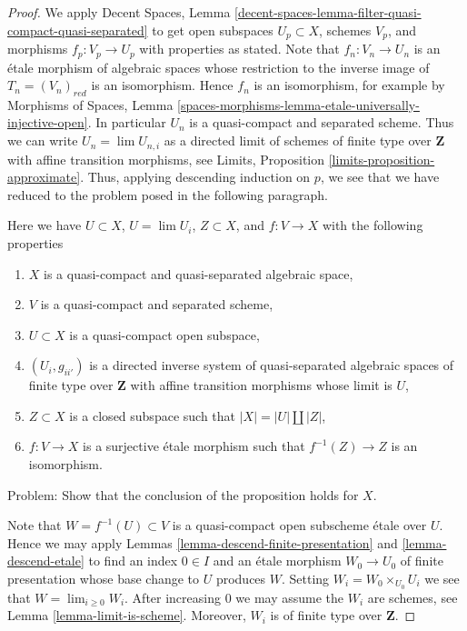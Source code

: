\begin{proof}
We apply Decent Spaces, Lemma
\ref{decent-spaces-lemma-filter-quasi-compact-quasi-separated}
to get open subspaces $U_p \subset X$, schemes $V_p$, and morphisms
$f_p : V_p \to U_p$ with properties as stated. Note that
$f_n : V_n \to U_n$ is an \'etale morphism of algebraic spaces
whose restriction to the inverse image of $T_n = (V_n)_{red}$ is an
isomorphism. Hence $f_n$ is an isomorphism, for example by
Morphisms of Spaces, Lemma
\ref{spaces-morphisms-lemma-etale-universally-injective-open}.
In particular $U_n$ is a quasi-compact and separated scheme.
Thus we can write $U_n = \lim U_{n, i}$ as a directed limit
of schemes of finite type over $\mathbf{Z}$ with affine transition
morphisms, see Limits, Proposition \ref{limits-proposition-approximate}.
Thus, applying descending induction on $p$, we see that we have reduced
to the problem posed in the following paragraph.

\medskip\noindent
Here we have $U \subset X$, $U = \lim U_i$, $Z \subset X$, and
$f : V \to X$ with the following properties
\begin{enumerate}
\item $X$ is a quasi-compact and quasi-separated algebraic space,
\item $V$ is a quasi-compact and separated scheme,
\item $U \subset X$ is a quasi-compact open subspace,
\item $(U_i, g_{ii'})$ is a directed inverse system of
quasi-separated algebraic spaces
of finite type over $\mathbf{Z}$ with affine transition morphisms
whose limit is $U$,
\item $Z \subset X$ is a closed subspace such that $|X| = |U| \amalg |Z|$,
\item $f : V \to X$ is a surjective \'etale morphism such that
$f^{-1}(Z) \to Z$ is an isomorphism.
\end{enumerate}
Problem: Show that the conclusion of the proposition holds for $X$.

\medskip\noindent
Note that $W = f^{-1}(U) \subset V$ is a quasi-compact open subscheme
\'etale over $U$. Hence we may apply
Lemmas \ref{lemma-descend-finite-presentation} and \ref{lemma-descend-etale}
to find an index $0 \in I$ and an \'etale morphism $W_0 \to U_0$
of finite presentation whose base change to $U$ produces $W$. Setting
$W_i = W_0 \times_{U_0} U_i$ we see that $W = \lim_{i \geq 0} W_i$. After
increasing $0$ we may assume the $W_i$ are schemes, see
Lemma \ref{lemma-limit-is-scheme}.
Moreover, $W_i$ is of finite type over $\mathbf{Z}$.


\end{proof}
